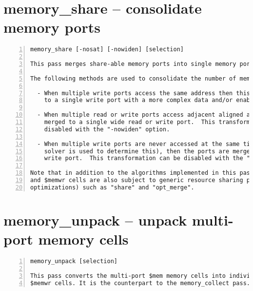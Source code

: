 \section{memory\_share -- consolidate memory ports}
\label{cmd:memory_share}
\begin{lstlisting}[numbers=left,frame=single]
    memory_share [-nosat] [-nowiden] [selection]

This pass merges share-able memory ports into single memory ports.

The following methods are used to consolidate the number of memory ports:

  - When multiple write ports access the same address then this is converted
    to a single write port with a more complex data and/or enable logic path.

  - When multiple read or write ports access adjacent aligned addresses, they are
    merged to a single wide read or write port.  This transformation can be
    disabled with the "-nowiden" option.

  - When multiple write ports are never accessed at the same time (a SAT
    solver is used to determine this), then the ports are merged into a single
    write port.  This transformation can be disabled with the "-nosat" option.

Note that in addition to the algorithms implemented in this pass, the $memrd
and $memwr cells are also subject to generic resource sharing passes (and other
optimizations) such as "share" and "opt_merge".
\end{lstlisting}

\section{memory\_unpack -- unpack multi-port memory cells}
\label{cmd:memory_unpack}
\begin{lstlisting}[numbers=left,frame=single]
    memory_unpack [selection]

This pass converts the multi-port $mem memory cells into individual $memrd and
$memwr cells. It is the counterpart to the memory_collect pass.
\end{lstlisting}

